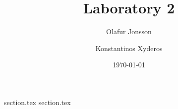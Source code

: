 \documentclass[12pt]{article}
\title{Laboratory 2}
\author{
        Olafur Jonsson \\
            \and
        Konstantinos Xyderos \\
}
\date{\today}
\begin{document}
\maketitle

{section.tex}
{section.tex}
\end{document}
